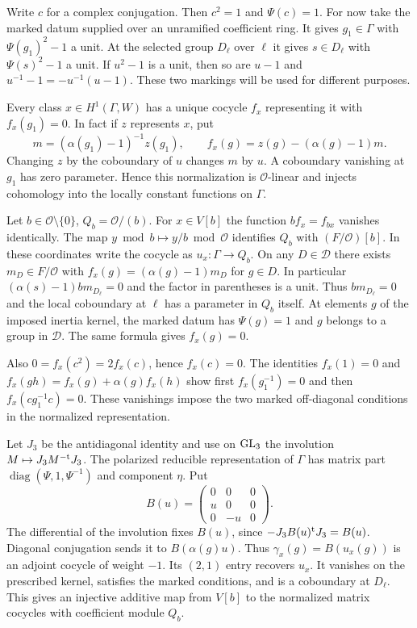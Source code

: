 Write \(c\) for a complex conjugation. Then \(c^2=1\) and
\(\Psi(c)=1\). For now take the marked datum supplied over an
unramified coefficient ring. It gives \(g_1\in\Gamma\) with
\(\Psi(g_1)^2-1\) a unit. At the selected group \(D_\ell\) over
\(\ell\) it gives \(s\in D_\ell\) with \(\Psi(s)^2-1\) a unit.
If \(u^2-1\) is a unit, then so are \(u-1\) and
\(u^{-1}-1=-u^{-1}(u-1)\). These two markings will be used for
different purposes.

Every class \(x\in H^1(\Gamma,W)\) has a unique cocycle \(f_x\)
representing it with \(f_x(g_1)=0\). In fact if \(z\) represents \(x\),
put
\[
 m=(\alpha(g_1)-1)^{-1}z(g_1),\qquad
 f_x(g)=z(g)-(\alpha(g)-1)m .
\]
Changing \(z\) by the coboundary of \(u\) changes \(m\) by \(u\).
A coboundary vanishing at \(g_1\) has zero parameter. Hence this
normalization is \(\mathcal O\)-linear and injects cohomology into
the locally constant functions on \(\Gamma\).

Let \(b\in\mathcal O\setminus\{0\}\), \(Q_b=\mathcal O/(b)\).
For \(x\in V[b]\) the function \(bf_x=f_{bx}\) vanishes identically.
The map \(y\bmod b\mapsto y/b\bmod\mathcal O\) identifies \(Q_b\)
with \((F/\mathcal O)[b]\). In these coordinates write the cocycle
as \(u_x:\Gamma\to Q_b\). On any \(D\in\mathcal D\) there exists
\(m_D\in F/\mathcal O\) with
\(f_x(g)=(\alpha(g)-1)m_D\) for \(g\in D\). In particular
\((\alpha(s)-1)bm_{D_\ell}=0\) and the factor in parentheses is a
unit. Thus \(bm_{D_\ell}=0\) and the local coboundary at \(\ell\) has a
parameter in \(Q_b\) itself. At elements \(g\) of the imposed
inertia kernel, the marked datum has \(\Psi(g)=1\) and \(g\) belongs
to a group in \(\mathcal D\). The same formula gives \(f_x(g)=0\).

Also \(0=f_x(c^2)=2 f_x(c)\), hence \(f_x(c)=0\).
The identities \(f_x(1)=0\) and
\(f_x(gh)=f_x(g)+\alpha(g)f_x(h)\) show first
\(f_x(g_1^{-1})=0\) and then \(f_x(cg_1^{-1}c)=0\).
These vanishings impose the two marked off-diagonal conditions in
the normalized representation.

Let \(J_3\) be the antidiagonal identity and use on \({\rm GL}_3\)
the involution \(M\mapsto J_3 M^{-{\rm t}} J_3\).
The polarized reducible representation of \(\Gamma\) has matrix part
\(\operatorname{diag}(\Psi,1,\Psi^{-1})\) and component \(\eta\).
Put
\[
 B(u)=\begin{pmatrix}0&0&0\\u&0&0\\0&-u&0\end{pmatrix}.
\]
The differential of the involution fixes \(B(u)\), since
\(-J_3 B(u)^{\rm t}J_3=B(u)\). Diagonal conjugation sends it to
\(B(\alpha(g)u)\). Thus \(\gamma_x(g)=B(u_x(g))\) is an adjoint
cocycle of weight \(-1\). Its \((2,1)\) entry recovers \(u_x\).
It vanishes on the prescribed kernel, satisfies the marked
conditions, and is a coboundary at \(D_\ell\). This gives an
injective additive map from \(V[b]\) to the normalized matrix
cocycles with coefficient module \(Q_b\).

